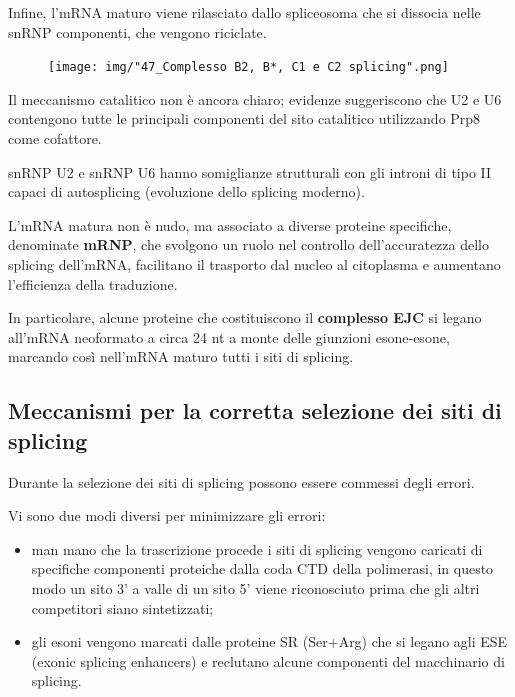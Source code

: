 \documentclass[11pt]{book}
\begin{document}
Infine, l'mRNA maturo viene rilasciato dallo spliceosoma che si dissocia
nelle snRNP componenti, che vengono riciclate.

\begin{figure}[htp]
\centering
\texttt{[image: img/"47\_Complesso B2, B*, C1 e C2 splicing".png]}
\caption{}
\label{complesso-b2-b-c1-e-c2-splicing}
\end{figure}

Il meccanismo catalitico non è ancora chiaro; evidenze suggeriscono che
U2 e U6 contengono tutte le principali componenti del sito catalitico
utilizzando Prp8 come cofattore.

snRNP U2 e snRNP U6 hanno somiglianze strutturali con gli introni di
tipo II capaci di autosplicing (evoluzione dello splicing moderno).

L'mRNA matura non è nudo, ma associato a diverse proteine specifiche,
denominate \textbf{mRNP}, che svolgono un ruolo nel controllo
dell'accuratezza dello splicing dell'mRNA, facilitano il trasporto dal
nucleo al citoplasma e aumentano l'efficienza della traduzione.

In particolare, alcune proteine che costituiscono il \textbf{complesso
EJC} si legano all'mRNA neoformato a circa 24 nt a monte delle giunzioni
esone-esone, marcando così nell'mRNA maturo tutti i siti di splicing.

\subsection{Meccanismi per la corretta selezione dei siti di
splicing}\label{meccanismi-per-la-corretta-selezione-dei-siti-di-splicing}

Durante la selezione dei siti di splicing possono essere commessi degli
errori.

Vi sono due modi diversi per minimizzare gli errori:

\begin{itemize}
\itemsep1pt\parskip0pt
\item
  man mano che la trascrizione procede i siti di splicing vengono
  caricati di specifiche componenti proteiche dalla coda CTD della
  polimerasi, in questo modo un sito 3' a valle di un sito 5' viene
  riconosciuto prima che gli altri competitori siano sintetizzati;
\item
  gli esoni vengono marcati dalle proteine SR (Ser+Arg) che si legano
  agli ESE (exonic splicing enhancers) e reclutano alcune componenti del
  macchinario di splicing.
\end{itemize}
\end{document}
